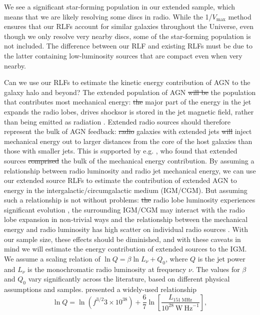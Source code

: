 \documentclass[11pt, a4paper]{book}
\providecommand{\DIFaddtex}[1]{{\protect\color{blue}\uwave{#1}}} %
\providecommand{\DIFdeltex}[1]{{\protect\color{red}\sout{#1}}}                      %
\providecommand{\DIFaddbegin}{} %
\providecommand{\DIFaddend}{} %
\providecommand{\DIFdelbegin}{} %
\providecommand{\DIFdelend}{} %
\providecommand{\DIFadd}[1]{\texorpdfstring{\DIFaddtex{#1}}{#1}} %
\providecommand{\DIFdel}[1]{\texorpdfstring{\DIFdeltex{#1}}{}} %
\newcommand{\DIFscaledelfig}{0.5}
\newlength{\DIFdelgraphicswidth} %
\newlength{\DIFdelgraphicsheight} %
\newcommand{\DIFaddincludegraphics}[2][]{{\color{blue}\fbox{\DIFOincludegraphics[#1]{#2}}}} %
\newcommand{\DIFdelincludegraphics}[2][]{%
\sbox{\DIFdelgraphicsbox}{\DIFOincludegraphics[#1]{#2}}%
\settoboxwidth{\DIFdelgraphicswidth}{\DIFdelgraphicsbox} %
\settoboxtotalheight{\DIFdelgraphicsheight}{\DIFdelgraphicsbox} %
\scalebox{\DIFscaledelfig}{%
\parbox[b]{\DIFdelgraphicswidth}{\usebox{\DIFdelgraphicsbox}\\[-\baselineskip] \rule{\DIFdelgraphicswidth}{0em}}\llap{\resizebox{\DIFdelgraphicswidth}{\DIFdelgraphicsheight}{%
\setlength{\unitlength}{\DIFdelgraphicswidth}%
\begin{picture}(1,1)%
\thicklines\linethickness{2pt} %
{\color[rgb]{1,0,0}\put(0,0){\framebox(1,1){}}}%
{\color[rgb]{1,0,0}\put(0,0){\line( 1,1){1}}}%
{\color[rgb]{1,0,0}\put(0,1){\line(1,-1){1}}}%
\end{picture}%
}\hspace*{3pt}}} %
} %
\DeclareRobustCommand{\DIFaddbegin}{\DIFOaddbegin \let\includegraphics\DIFaddincludegraphics} %
\DeclareRobustCommand{\DIFaddend}{\DIFOaddend \let\includegraphics\DIFOincludegraphics} %
\DeclareRobustCommand{\DIFdelbegin}{\DIFOdelbegin \let\includegraphics\DIFdelincludegraphics} %
\DeclareRobustCommand{\DIFdelend}{\DIFOaddend \let\includegraphics\DIFOincludegraphics} %
\begin{document}
      We see a significant star-forming population in our extended sample, which means that we are likely resolving some discs in radio. While the 1/$V_{\max}$ method ensures that our RLFs account for similar galaxies throughout the Universe, even though we only resolve very nearby discs, some of the star-forming population is not included. The difference between our RLF and existing RLFs must be due to the latter containing low-luminosity sources that are compact even when very nearby.

      Can we use our RLFs to estimate the kinetic energy contribution of AGN to the galaxy halo and beyond? The extended population of AGN \DIFdelbegin \DIFdel{will be }\DIFdelend \DIFaddbegin \DIFadd{is }\DIFaddend the population that contributes \DIFaddbegin \DIFadd{the }\DIFaddend most mechanical energy: \DIFdelbegin \DIFdel{the }\DIFdelend \DIFaddbegin \DIFadd{The }\DIFaddend major part of the energy in the jet expands the radio lobes, drives shocks\DIFaddbegin \DIFadd{, }\DIFaddend or is stored in the jet magnetic field, rather than being emitted as radiation \citep{godfrey16power, hardcastle14lobes}. Extended radio sources should therefore represent the bulk of AGN feedback: \DIFdelbegin \DIFdel{radio }\DIFdelend \DIFaddbegin \DIFadd{Radio }\DIFaddend galaxies with extended jets \DIFdelbegin \DIFdel{will }\DIFdelend inject mechanical energy out to larger distances from the core of the host galaxies than those with smaller jets. This is supported by e.g. \citet{turner15agn}, who found that extended sources \DIFdelbegin \DIFdel{comprised }\DIFdelend \DIFaddbegin \DIFadd{comprise }\DIFaddend the bulk of the mechanical energy contribution. By assuming a relationship between radio luminosity and radio jet mechanical energy, we can use our extended source RLFs to estimate the contribution of extended AGN to energy in the intergalactic/circumgalactic medium (IGM/CGM). But assuming such a relationship is not without problems: \DIFdelbegin \DIFdel{the }\DIFdelend \DIFaddbegin \DIFadd{The }\DIFaddend radio lobe luminosity experiences significant evolution \citep[e.g.][]{bicknell97css}, the surrounding IGM/CGM may interact with the radio lobe expansion in non-trivial ways \citep[e.g.][]{hardcastle13lobes}\DIFaddbegin \DIFadd{, }\DIFaddend and the relationship between the mechanical energy and radio luminosity has high scatter on individual radio sources \citep{hardcastle13lobes}. With our sample size, these effects should be diminished, and with these caveats in mind we will estimate the energy contribution of extended sources to the IGM. We assume a scaling relation of $\ln Q = \beta \ln L_\nu + Q_0$, where $Q$ is the jet power and $L_\nu$ is the monochromatic radio luminosity at frequency $\nu$. The values for $\beta$ and $Q_0$ vary significantly across the literature, based on different physical assumptions and samples. \citet{willott99radio} presented a widely-used relationship\DIFaddbegin \DIFadd{:
      }\DIFaddend \begin{equation}
        \ln Q = \ln (f^{3/2} 3 \times 10^{38}) + \frac{6}{7} \ln \left[\frac{L_{151~\mathrm{MHz}}}{10^{28}~\mathrm{W\ Hz}^{-1}}\right],
      \end{equation}
\end{document}
